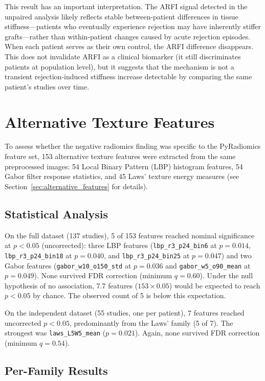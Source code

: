 This result has an important interpretation. The ARFI signal detected in the unpaired analysis likely reflects stable between-patient differences in tissue stiffness---patients who eventually experience rejection may have inherently stiffer grafts---rather than within-patient changes caused by acute rejection episodes. When each patient serves as their own control, the ARFI difference disappears. This does not invalidate ARFI as a clinical biomarker (it still discriminates patients at population level), but it suggests that the mechanism is not a transient rejection-induced stiffness increase detectable by comparing the same patient's studies over time.

\section{Alternative Texture Features}
\label{sec:alternative_results}

To assess whether the negative radiomics finding was specific to the PyRadiomics feature set, 153 alternative texture features were extracted from the same preprocessed images: 54 Local Binary Pattern (LBP) histogram features, 54 Gabor filter response statistics, and 45 Laws' texture energy measures (see Section~\ref{sec:alternative_features} for details).

\subsection{Statistical Analysis}

On the full dataset (137 studies), 5 of 153 features reached nominal significance at $p < 0.05$ (uncorrected): three LBP features (\texttt{lbp\_r3\_p24\_bin6} at $p = 0.014$, \texttt{lbp\_r3\_p24\_bin18} at $p = 0.040$, and \texttt{lbp\_r3\_p24\_bin25} at $p = 0.047$) and two Gabor features (\texttt{gabor\_w10\_o150\_std} at $p = 0.036$ and \texttt{gabor\_w5\_o90\_mean} at $p = 0.049$). None survived FDR correction (minimum $q = 0.60$). Under the null hypothesis of no association, 7.7 features ($153 \times 0.05$) would be expected to reach $p < 0.05$ by chance. The observed count of 5 is below this expectation.

On the independent dataset (55 studies, one per patient), 7 features reached uncorrected $p < 0.05$, predominantly from the Laws' family (5 of 7). The strongest was \texttt{laws\_L5W5\_mean} ($p = 0.021$). Again, none survived FDR correction (minimum $q = 0.54$).

\subsection{Per-Family Results}


